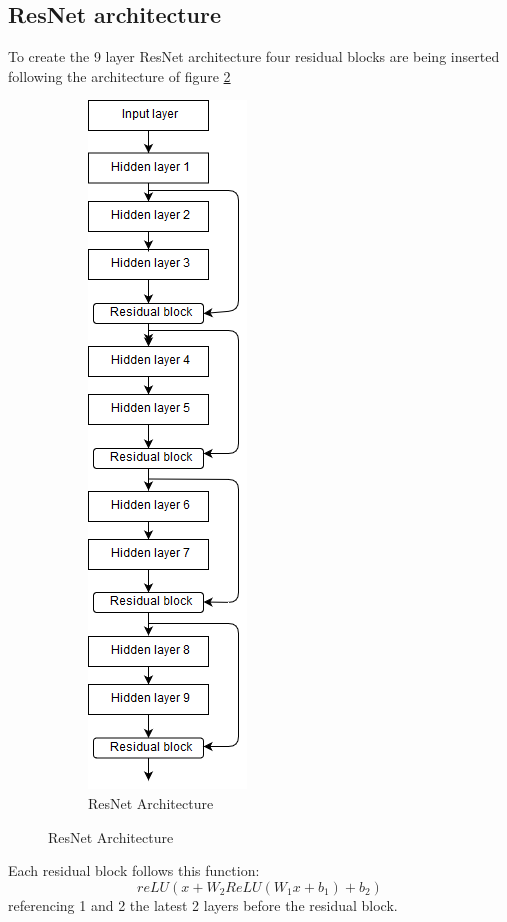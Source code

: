 \documentclass[11pt]{article} %
\begin{document}
\subsection*{ResNet architecture}
To create the 9 layer ResNet architecture four residual blocks are being inserted following the architecture of figure \ref{resNet}
\begin{figure}
\begin{figure}
    \includegraphics[scale=0.5]{images/resNetArch.PNG}
    \caption{ResNet Architecture}
    \label{resNet}
\end{figure}
\end{figure}
Each residual block  follows this function:
\[reLU(x+W_2ReLU(W_1x+b_1)+b_2)\]
referencing 1 and 2 the latest 2 layers before the residual block.
\end{document}
